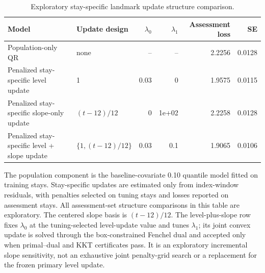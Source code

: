 \begin{table}[!htbp]
\caption{Exploratory stay-specific landmark update structure comparison.}
\label{tab:random_effect_structure_comparison}
\centering
\begin{tabular}{llrrrr}
\hline
Model & Update design & $\lambda_0$ & $\lambda_1$ & Assessment loss & SE\\
\hline
Population-only QR & none & -- & -- & 2.2256 & 0.0128\\
Penalized stay-specific level update & 1 & 0.03 & 0 & 1.9575 & 0.0115\\
Penalized stay-specific slope-only update & $(t-12)/12$ & 0 & 1e+02 & 2.2258 & 0.0128\\
Penalized stay-specific level + slope update & $\{1,(t-12)/12\}$ & 0.03 & 0.1 & 1.9065 & 0.0106\\
\hline
\end{tabular}
\par\smallskip
\footnotesize{The population component is the baseline-covariate 0.10 quantile model fitted on training stays. Stay-specific updates are estimated only from index-window residuals, with penalties selected on tuning stays and losses reported on assessment stays. All assessment-set structure comparisons in this table are exploratory. The centered slope basis is $(t-12)/12$. The level-plus-slope row fixes $\lambda_0$ at the tuning-selected level-update value and tunes $\lambda_1$; its joint convex update is solved through the box-constrained Fenchel dual and accepted only when primal--dual and KKT certificates pass. It is an exploratory incremental slope sensitivity, not an exhaustive joint penalty-grid search or a replacement for the frozen primary level update.}
\end{table}
